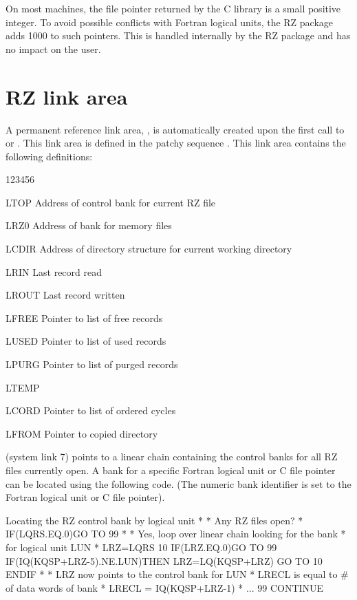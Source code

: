 On most machines, the file pointer returned by the C library
is a small positive integer. To avoid possible conflicts with
Fortran logical units, the RZ package adds 1000 to such
pointers. This is handled internally by the RZ package and has
no impact on the user.

\section{RZ link area}

A permanent reference link area, , is automatically created upon the first
call to  or . This link area is defined
in the patchy sequence .
This link area contains the following definitions:
\begin{DLtt}{123456}
\item[LTOP]Address of control bank for current RZ file
\item[LRZ0]Address of bank for memory files
\item[LCDIR]Address of directory structure for current working directory
\item[LRIN]Last record read 
\item[LROUT]Last record written
\item[LFREE]Pointer to list of free records
\item[LUSED]Pointer to list of used records
\item[LPURG]Pointer to list of purged records
\item[LTEMP]
\item[LCORD]Pointer to list of ordered cycles
\item[LFROM]Pointer to copied directory
\end{DLtt}
 (system link 7) points to a linear chain containing
the control banks for all RZ files currently open.
A bank for a specific Fortran logical unit or C file pointer 
can be located using the following code.
(The numeric bank identifier is set to the Fortran logical
unit or C file pointer). 
\newpage
\begin{XMPt}{Locating the RZ control bank by logical unit}
*
*     Any RZ files open?
*
      IF(LQRS.EQ.0)GO TO 99
*
*     Yes, loop over linear chain looking for the bank
*     for logical unit LUN
*
      LRZ=LQRS
  10  IF(LRZ.EQ.0)GO TO 99
      IF(IQ(KQSP+LRZ-5).NE.LUN)THEN
         LRZ=LQ(KQSP+LRZ)
         GO TO 10
      ENDIF
*
*     LRZ now points to the control bank for LUN
*     LRECL is equal to # of data words of bank
*
      LRECL = IQ(KQSP+LRZ-1)
*
...
  99  CONTINUE
\end{XMPt}
\newpage

